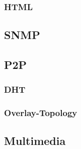 \documentclass[a4paper,10pt]{scrartcl}
\begin{document}
\subsubsection{HTML}
\subsection{SNMP}
\subsection{P2P}
\subsubsection{DHT}
\subsubsection{Overlay-Topology}
\subsection{Multimedia}
\end{document}
